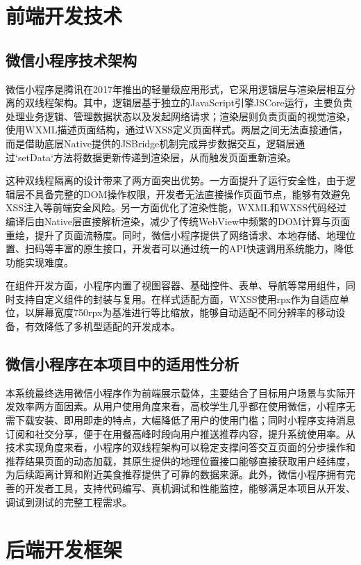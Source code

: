 \section{前端开发技术}

\subsection{微信小程序技术架构}
微信小程序是腾讯在2017年推出的轻量级应用形式\super{[19]}，它采用逻辑层与渲染层相互分离的双线程架构。其中，逻辑层基于独立的JavaScript引擎JSCore运行，主要负责处理业务逻辑、管理数据状态以及发起网络请求；渲染层则负责页面的视觉渲染，使用WXML描述页面结构，通过WXSS定义页面样式。两层之间无法直接通信，而是借助底层Native提供的JSBridge机制完成异步数据交互，逻辑层通过`setData`方法将数据更新传递到渲染层，从而触发页面重新渲染。

这种双线程隔离的设计带来了两方面突出优势。一方面提升了运行安全性，由于逻辑层不具备完整的DOM操作权限，开发者无法直接操作页面节点，能够有效避免XSS注入等前端安全风险。另一方面优化了渲染性能，WXML和WXSS代码经过编译后由Native层直接解析渲染，减少了传统WebView中频繁的DOM计算与页面重绘，提升了页面流畅度。同时，微信小程序提供了网络请求、本地存储、地理位置、扫码等丰富的原生接口，开发者可以通过统一的API快速调用系统能力，降低功能实现难度。

在组件开发方面，小程序内置了视图容器、基础控件、表单、导航等常用组件，同时支持自定义组件的封装与复用。在样式适配方面，WXSS使用rpx作为自适应单位，以屏幕宽度750rpx为基准进行等比缩放，能够自动适配不同分辨率的移动设备，有效降低了多机型适配的开发成本。

\subsection{微信小程序在本项目中的适用性分析}
本系统最终选用微信小程序作为前端展示载体，主要结合了目标用户场景与实际开发效率两方面因素。从用户使用角度来看，高校学生几乎都在使用微信，小程序无需下载安装、即用即走的特点，大幅降低了用户的使用门槛；同时小程序支持消息订阅和社交分享，便于在用餐高峰时段向用户推送推荐内容，提升系统使用率。从技术实现角度来看，小程序的双线程架构可以稳定支撑问答交互页面的分步操作和推荐结果页面的动态加载，其原生提供的地理位置接口能够直接获取用户经纬度，为后续距离计算和附近美食推荐提供了可靠的数据来源。此外，微信小程序拥有完善的开发者工具，支持代码编写、真机调试和性能监控，能够满足本项目从开发、调试到测试的完整工程需求。


\section{后端开发框架}

